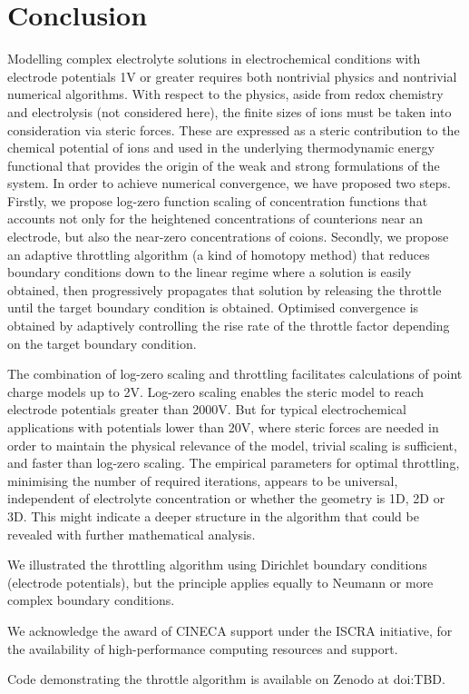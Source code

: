 \section{Conclusion}

Modelling complex electrolyte solutions in electrochemical conditions
with electrode potentials 1V or greater requires both nontrivial
physics and nontrivial numerical algorithms.
With respect to the
physics, aside from redox chemistry and electrolysis (not considered
here), the finite sizes of ions must be taken into consideration via
steric forces. These are expressed as a steric contribution to the
chemical potential of ions and used in the underlying thermodynamic
energy functional that provides the origin of the weak and strong
formulations of the system.
In order to achieve numerical convergence, we have proposed two
steps. Firstly, we propose log-zero function scaling of
concentration functions that accounts
not only for the heightened concentrations of counterions near an
electrode, but also the near-zero concentrations of coions. Secondly,
we propose an adaptive throttling algorithm (a kind of homotopy
method) that reduces boundary conditions 
down to the linear regime where a solution is easily obtained, then
progressively propagates that solution by releasing the throttle
until the target boundary condition is obtained. Optimised convergence
is obtained by adaptively controlling the rise rate of the throttle factor
depending on the target boundary condition.

The combination of
log-zero scaling and throttling facilitates calculations of point
charge models up to 2V. Log-zero scaling enables
the steric model to reach electrode potentials greater than 2000V.
But for typical electrochemical applications with potentials lower than 20V,
where steric forces are needed in order to maintain the physical relevance
of the model, trivial scaling is sufficient, and faster than log-zero scaling.
The empirical parameters for optimal throttling, minimising the number of
required iterations, appears to be universal, independent of
electrolyte concentration or whether the geometry is 1D, 2D or 3D.
This might indicate a deeper structure in the algorithm that could be
revealed with further mathematical analysis.

We illustrated the throttling algorithm using Dirichlet boundary
conditions (electrode potentials), but the  principle applies
equally to Neumann or more complex boundary conditions.

\begin{acknowledgement}
  We acknowledge the award of CINECA support under the ISCRA
  initiative, for the availability of high-performance computing
  resources and support.

  Code demonstrating the throttle algorithm is available on Zenodo at doi:TBD.
\end{acknowledgement}





